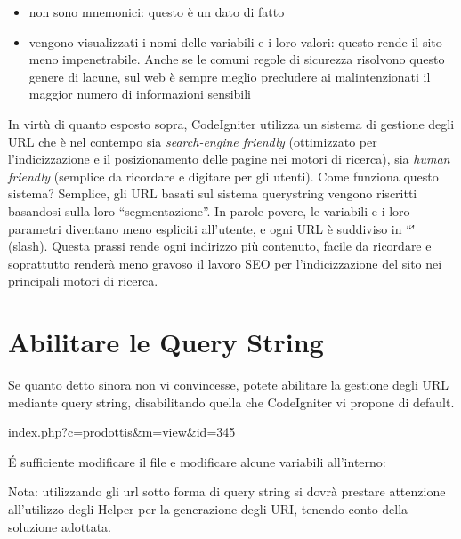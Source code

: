 \begin{itemize}
\item non sono mnemonici: questo è un dato di fatto
\item vengono visualizzati i nomi delle variabili e i loro valori: questo rende il sito meno impenetrabile. Anche se le comuni regole di sicurezza risolvono questo genere di lacune, sul web è sempre meglio precludere ai malintenzionati il maggior numero di informazioni sensibili
\end{itemize}

In virtù di quanto esposto sopra, CodeIgniter utilizza un sistema di gestione degli \ac{URL} che è nel contempo sia \emph{search-engine friendly} (ottimizzato per l'indicizzazione e il posizionamento delle pagine nei motori di ricerca), sia \emph{human friendly} (semplice da ricordare e digitare per gli utenti). Come funziona questo sistema? Semplice, gli \ac{URL} basati sul sistema querystring vengono riscritti basandosi sulla loro ``segmentazione''. In parole povere, le variabili e i loro parametri diventano meno espliciti all'utente, e ogni \ac{URL} è suddiviso in ``\'' (slash). Questa prassi rende ogni indirizzo più contenuto, facile da ricordare e soprattutto renderà meno gravoso il lavoro SEO per l'indicizzazione del sito nei principali motori di ricerca.

\section{Abilitare le Query String}
Se quanto detto sinora non vi convincesse, potete abilitare la gestione degli \ac{URL} mediante query string, disabilitando quella che CodeIgniter vi propone di default.

\begin{codef}
index.php?c=prodottis&m=view&id=345
\end{codef}

\'E sufficiente modificare il file  e modificare alcune variabili all'interno:


Nota: utilizzando gli url sotto forma di query string si dovrà prestare attenzione all'utilizzo degli Helper per la generazione degli \ac{URI}, tenendo conto della soluzione adottata.

